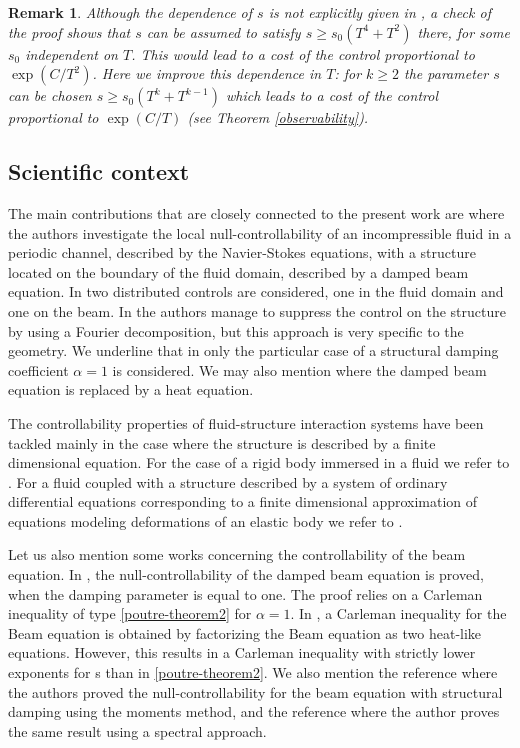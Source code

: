 \documentclass[a4paper, 12pt]{article}
\theoremstyle{plain}
\newtheorem{remark}[theorem]{Remark}
\theoremstyle{definition}
\numberwithin{theorem}{section}
\numberwithin{equation}{section}
\begin{document}
\begin{remark}\label{Rkcout2}
Although the dependence of $s$ is not explicitly given in \cite{Sourav}, a check of the proof shows that $s$ can be assumed to satisfy $s\geq s_0(T^4+T^2)$ there, for some $s_0$ independent on $T$. This would lead to a cost of the control proportional to $\exp(C/T^2)$. Here we improve this dependence in $T$: for $k\geq 2$ the parameter $s$ can be chosen $s\geq s_0(T^k+T^{k-1})$ which leads to a cost of the control proportional to $\exp(C/T)$ (see Theorem \ref{observability}).
\end{remark}



\subsection{Scientific context}\label{Sect1.4}

The main contributions that are closely connected to the present work are \cite{Buffe, Buffe2025} where the authors investigate the local null-controllability of an incompressible fluid in a periodic channel, described by the Navier-Stokes equations, with a structure located on the boundary of the fluid domain, described by a damped beam equation. In \cite{Buffe} two distributed controls are considered, one in the fluid domain and one on the beam. In \cite{Buffe2025} the authors manage to suppress the control on the structure by using a Fourier decomposition, but this approach is very specific to the geometry. We underline that in \cite{Buffe, Buffe2025} only the particular case of a structural damping coefficient $\alpha=1$ is considered. We may also mention \cite{buffe2022} where the damped beam equation is replaced by a heat equation. 

The controllability properties of fluid-structure interaction systems have been tackled mainly in
the case where the structure is described by a finite dimensional equation. For the case of a rigid body immersed in a fluid we refer to \cite{MG, MA, UT, IA, Raymond-Vanninathan2009}. For a fluid coupled with a structure described by a system of ordinary differential equations corresponding to a ﬁnite dimensional approximation of equations modeling deformations of an
elastic body we refer to \cite{Raymond-Vanninathan2010, Lequeurre2013}. 

Let us also mention some works concerning the controllability of the beam equation. In \cite{Sourav}, the null-controllability of the damped beam equation is proved, when the damping parameter is equal to one. The proof relies on a Carleman inequality of type \eqref{poutre-theorem2} for $\alpha=1$. In \cite{Fu2020}, a Carleman inequality for the Beam equation is obtained by factorizing the Beam equation as two heat-like equations. However, this results in a Carleman inequality with strictly lower exponents for s than in \eqref{poutre-theorem2}. We also mention the reference \cite{Avd} where the authors proved the null-controllability for the beam equation with structural damping using the moments method, and the reference \cite{Miller} where the author proves the same result using a spectral approach.
\end{document}
